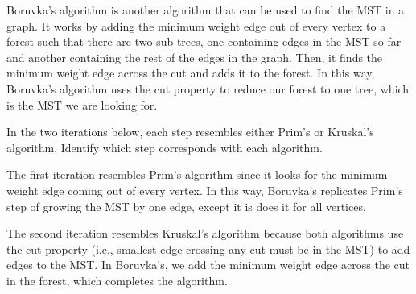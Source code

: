 \question Boruvka's algorithm is another algorithm that can be used to find the MST in a graph. It works by adding the minimum weight edge out of every vertex to a forest such that there are two sub-trees, one containing edges in the MST-so-far and another containing the rest of the edges in the graph. Then, it finds the minimum weight edge across the cut and adds it to the forest. In this way, Boruvka's algorithm uses the cut property to reduce our forest to one tree, which is the MST we are looking for.

In the two iterations below, each step resembles either Prim's or Kruskal's algorithm. Identify which step corresponds with each algorithm.

\begin{solution}[0.5in]
    The first iteration resembles Prim's algorithm since it looks for the minimum-weight edge coming out of every vertex. In this way, Boruvka's replicates Prim's step of growing the MST by one edge, except it is does it for all vertices.

    The second iteration resembles Kruskal's algorithm because both algorithms use the cut property (i.e., smallest edge crossing any cut must be in the MST) to add edges to the MST. In Boruvka's, we add the minimum weight edge across the cut in the forest, which completes the algorithm.
\end{solution}

